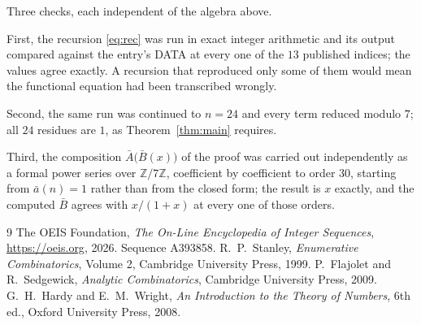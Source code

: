 \documentclass[11pt,a4paper]{article}
\theoremstyle{plain}
\theoremstyle{definition}
\begin{document}
Three checks, each independent of the algebra above.

First, the recursion \eqref{eq:rec} was run in exact integer arithmetic and its output
compared against the entry's DATA at every one of the $13$ published indices; the
values agree exactly. A recursion that reproduced only some of them would mean the
functional equation had been transcribed wrongly.

Second, the same run was continued to $n=24$ and every term reduced modulo $7$; all
$24$ residues are $1$, as Theorem~\ref{thm:main} requires.

Third, the composition $\bar A\bigl(\bar B(x)\bigr)$ of the proof was carried out
independently as a formal power series over $\mathbb{Z}/7\mathbb{Z}$, coefficient by
coefficient to order $30$, starting from $\bar a(n)=1$ rather than from the closed form;
the result is $x$ exactly, and the computed $\bar B$ agrees with $x/(1+x)$ at every one of
those orders.

\begin{thebibliography}{9}
 The OEIS Foundation, \emph{The On-Line Encyclopedia of Integer
Sequences}, \url{https://oeis.org}, 2026. Sequence A393858.
 R.~P.~Stanley, \emph{Enumerative Combinatorics}, Volume 2, Cambridge
University Press, 1999.
 P.~Flajolet and R.~Sedgewick, \emph{Analytic Combinatorics}, Cambridge
University Press, 2009.
 G.~H.~Hardy and E.~M.~Wright, \emph{An Introduction to the Theory of
Numbers}, 6th ed., Oxford University Press, 2008.
\end{thebibliography}
\end{document}
